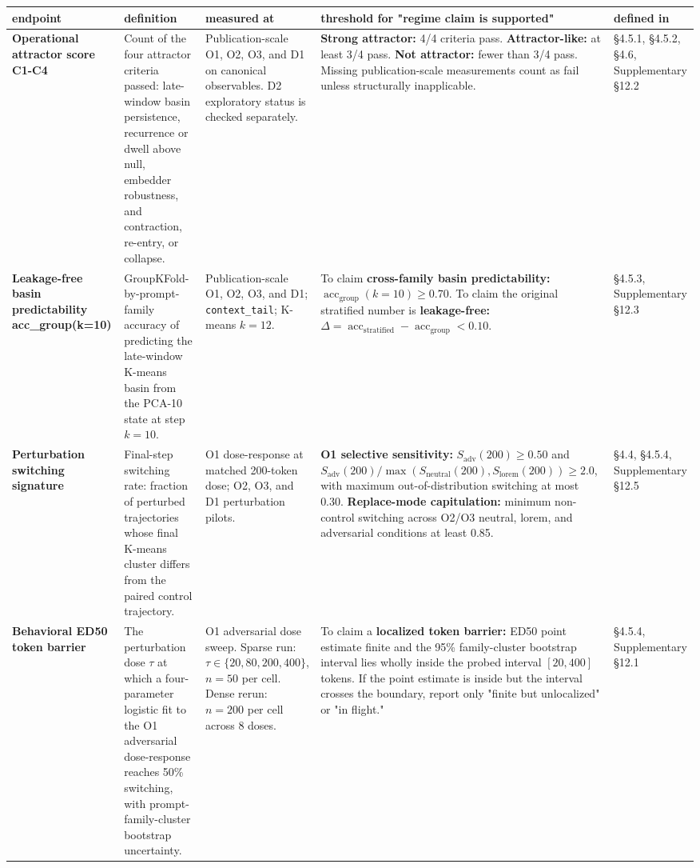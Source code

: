 \documentclass{article}
\theoremstyle{plain}
\theoremstyle{definition}
\begin{document}
\begin{table}[h!]
\centering
\small
\begin{tabularx}{\textwidth}{lYYYY}
\toprule
endpoint & definition & measured at & threshold for "regime claim is supported" & defined in \\
\midrule
\textbf{Operational attractor score C1-C4} & Count of the four attractor criteria passed: late-window basin persistence, recurrence or dwell above null, embedder robustness, and contraction, re-entry, or collapse. & Publication-scale O1, O2, O3, and D1 on canonical observables. D2 exploratory status is checked separately. & \textbf{Strong attractor:} 4/4 criteria pass. \textbf{Attractor-like:} at least 3/4 pass. \textbf{Not attractor:} fewer than 3/4 pass. Missing publication-scale measurements count as fail unless structurally inapplicable. & §4.5.1, §4.5.2, §4.6, Supplementary §12.2 \\
\textbf{Leakage-free basin predictability acc\_group(k=10)} & GroupKFold-by-prompt-family accuracy of predicting the late-window K-means basin from the PCA-10 state at step \(k=10\). & Publication-scale O1, O2, O3, and D1; \texttt{context\_tail}; K-means \(k=12\). & To claim \textbf{cross-family basin predictability:} \(\operatorname{acc}_{\mathrm{group}}(k=10)\geq0.70\). To claim the original stratified number is \textbf{leakage-free:} \(\Delta=\operatorname{acc}_{\mathrm{stratified}}-\operatorname{acc}_{\mathrm{group}}<0.10\). & §4.5.3, Supplementary §12.3 \\
\textbf{Perturbation switching signature} & Final-step switching rate: fraction of perturbed trajectories whose final K-means cluster differs from the paired control trajectory. & O1 dose-response at matched 200-token dose; O2, O3, and D1 perturbation pilots. & \textbf{O1 selective sensitivity:} \(S_{\mathrm{adv}}(200)\geq0.50\) and \(S_{\mathrm{adv}}(200)/\max(S_{\mathrm{neutral}}(200),S_{\mathrm{lorem}}(200))\geq2.0\), with maximum out-of-distribution switching at most 0.30. \textbf{Replace-mode capitulation:} minimum non-control switching across O2/O3 neutral, lorem, and adversarial conditions at least 0.85. & §4.4, §4.5.4, Supplementary §12.5 \\
\textbf{Behavioral ED50 token barrier} & The perturbation dose \(\tau\) at which a four-parameter logistic fit to the O1 adversarial dose-response reaches 50\% switching, with prompt-family-cluster bootstrap uncertainty. & O1 adversarial dose sweep. Sparse run: \(\tau\in\{20,80,200,400\}\), \(n=50\) per cell. Dense rerun: \(n=200\) per cell across 8 doses. & To claim a \textbf{localized token barrier:} ED50 point estimate finite and the 95\% family-cluster bootstrap interval lies wholly inside the probed interval \([20,400]\) tokens. If the point estimate is inside but the interval crosses the boundary, report only "finite but unlocalized" or "in flight." & §4.5.4, Supplementary §12.1 \\

\end{tabularx}
\end{table}
\end{document}
